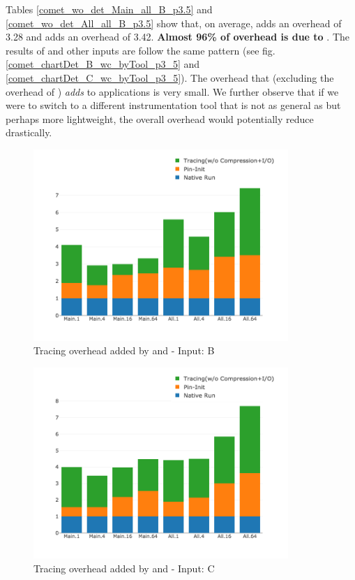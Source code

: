 Tables \ref{comet_wo_det_Main_all_B_p3.5} and
\ref{comet_wo_det_All_all_B_p3.5} show that, on average, \pininit adds
an overhead of 3.28  and \parlota adds an overhead of 3.42. 
%
\textbf{Almost 96\%
of \parlota overhead is due to \pin}. 
%
The results of \parlotm and
other inputs are follow the same pattern
(see fig. \ref{comet_chartDet_B_wc_byTool_p3_5} and \ref{comet_chartDet_C_wc_byTool_p3_5}). 
%
The overhead that \parlot (excluding the overhead of \pininit) {\em adds}
to applications is very small.
%
We further observe that if we were to switch to a different
instrumentation tool that is not as general as \pin but perhaps more
lightweight, the overall overhead would potentially reduce drastically. \\


\begin{figure}[t]
\centering
\includegraphics[width=3.8in]{figs.comet.newMed/comet_chartDet_B_woc_byTool_p3_5.png}
\caption{Tracing overhead added by \pininit and \parlotnc - Input: B 
}
\label{comet_chartDet_B_woc_byTool_p3_5}
\end{figure}

\begin{figure}[t]
\centering
\includegraphics[width=3.8in]{figs.comet.newMed/comet_chartDet_C_woc_byTool_p3_5.png}
\caption{Tracing overhead added by \pininit and \parlotnc -  Input: C}
\label{comet_chartDet_C_woc_byTool_p3_5}
\end{figure}

